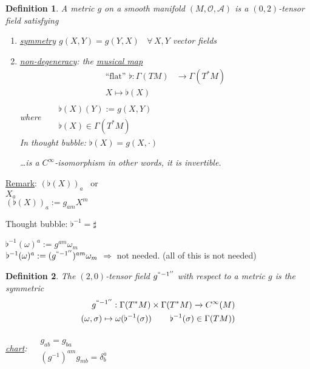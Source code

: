 \documentclass[10pt]{amsart}
\newtheorem{definition}{Definition}
\begin{document}
\begin{multicols*}{2}
	\begin{definition}
		A metric $g$ on a smooth manifold $(M,\mathcal{O}, \mathcal{A})$ is a $(0,2)$-tensor field satisfying
		\begin{enumerate}
			\item[(i)] \underline{symmetry} $g(X,Y) = g(Y,X)$ \, $\forall \, X, Y$ vector fields
			\item[(ii)] \underline{non-degeneracy}: the \underline{musical map} 
			\[
			\begin{aligned}
			\text{``flat''} \, \,  \flat : \Gamma(TM) & \to \Gamma(T^*M) \\ 
			X \mapsto \flat(X)
			\end{aligned}
			\]
			\emph{where} \quad \,  $\begin{aligned} & \quad \quad \\ 
			& \flat(X)(Y):= g(X,Y) \\
			& \flat(X) \in \Gamma(T^*M) \end{aligned}$ \\
			In thought bubble: $\flat(X) = g(X,\cdot)$
			
			\dots is a $C^{\infty}$-isomorphism in other words, it is invertible.  
			
			
		\end{enumerate}
	\end{definition}
	
	\underline{Remark}: $(\flat(X))_a$ \quad \, or \\
	$X_a$ \\
	$(\flat(X))_a := g_{am} X^m$
	
	Thought bubble: $\flat^{-1} = \sharp$
	
	$\flat^{-1}(\omega)^a := g^{am}\omega_m$ \\
	$\flat^{-1}(\omega)^a := (g^{``-1''})^{am}\omega_m$
	$\Longrightarrow $ not needed.  (all of this is not needed)
	
	\begin{definition}
		The $(2,0)$-tensor field $g^{``-1''}$ with respect to a metric $g$ is the symmetric
		\[
		\begin{aligned}
		g^{``-1''} : \Gamma(T^*M) \times \Gamma(T^*M) \xrightarrow{ ~ } C^{\infty}(M) \\
		(\omega, \sigma) \mapsto \omega( \flat^{-1}(\sigma)) \quad \quad \, \flat^{-1}(\sigma) \in \Gamma(TM))
		\end{aligned}
		\]
		
		\underline{chart}: $\begin{aligned} & \quad \\ 
		& g_{ab} = g_{ba} \\
		& (g^{-1})^{am} g_{mb} = \delta^a_b \end{aligned}$
		

\end{definition}
\end{multicols*}
\end{document}
